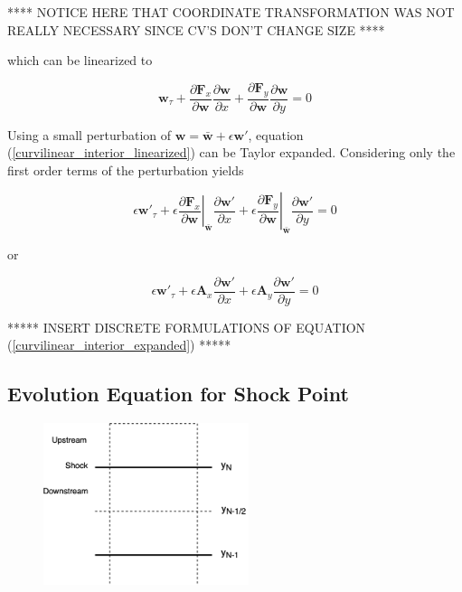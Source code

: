 \documentclass[10pt]{article}
\begin{document}
	 **** NOTICE HERE THAT COORDINATE TRANSFORMATION WAS NOT REALLY NECESSARY SINCE CV'S DON'T CHANGE SIZE ****
	
	which can be linearized to
	
	\begin{equation} \label{curvilinear_interior_linearized}
	\mathbf{w}_\tau  + \frac{\partial \mathbf{F}_x}{\partial \mathbf{w}} \frac{\partial \mathbf{w}}{\partial x}+ \frac{\partial \mathbf{F}_y}{\partial \mathbf{w}} \frac{\partial \mathbf{w}}{\partial y} = 0
	\end{equation}

	Using a small perturbation of $\mathbf{w} = \bar{\mathbf{w}} + \epsilon \mathbf{w}'$, equation (\ref{curvilinear_interior_linearized}) can be Taylor expanded. Considering only the first order terms of the perturbation yields
	
	$$ \epsilon \mathbf{w}'_\tau  + \epsilon \left. \frac{\partial \mathbf{F}_x}{\partial \mathbf{w}} \right|_{\bar{\mathbf{w}}} \frac{\partial \mathbf{w}'}{\partial x} + \epsilon \left. \frac{\partial \mathbf{F}_y}{\partial \mathbf{w}} \right|_{\bar{\mathbf{w}}} \frac{\partial \mathbf{w}'}{\partial y} = 0 $$
	
	or
	
	\begin{equation} \label{curvilinear_interior_expanded}
		\epsilon \mathbf{w}'_\tau  + \epsilon \mathbf{A}_x \frac{\partial \mathbf{w}'}{\partial x} + \epsilon \mathbf{A}_y \frac{\partial \mathbf{w}'}{\partial y} = 0
	\end{equation}
	
	***** INSERT DISCRETE FORMULATIONS OF EQUATION (\ref{curvilinear_interior_expanded}) *****
	
	\subsection{Evolution Equation for Shock Point}
	
	\begin{figure}[h]
		\includegraphics[width=6cm]{shock_point_y}
		\centering
	\end{figure}
	
\end{document}
